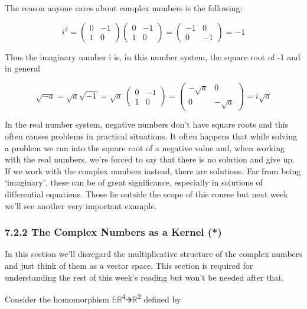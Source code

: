 \documentclass[oneside,english]{amsbook}
\numberwithin{section}{chapter}
\theoremstyle{plain}
\theoremstyle{definition}
\begin{document}
The reason anyone cares about complex numbers is the following:

\[i^{2} = \begin{pmatrix}
	0 & - 1 \\
	1 & 0
\end{pmatrix}\begin{pmatrix}
	0 & - 1 \\
	1 & 0
\end{pmatrix} = \begin{pmatrix}
	- 1 & 0 \\
	0 & - 1
\end{pmatrix} = - 1\]

Thus the imaginary number i is, in this number system, the square root
of -1 and in general

\[\sqrt{- a} = \sqrt{a}\sqrt{- 1} = \sqrt{a}\ \begin{pmatrix}
	0 & - 1 \\
	1 & 0
\end{pmatrix} = \begin{pmatrix}
	- \sqrt{a} & 0 \\
	0 & - \sqrt{a}
\end{pmatrix} = i\sqrt{a}\]

In the real number system, negative numbers don't have square roots and
this often causes problems in practical situations. It often happens
that while solving a problem we run into the square root of a negative
value and, when working with the real numbers, we're forced to say that
there is no solution and give up. If we work with the complex numbers
instead, there are solutions. Far from being `imaginary', these can be
of great significance, especially in solutions of differential
equations. Those lie outside the scope of this course but next week
we'll see another very important example.

\subsubsection{7.2.2 The Complex Numbers as a Kernel
	(*)}\label{the-complex-numbers-as-a-kernel}

In this section we'll disregard the multiplicative structure of the
complex numbers and just think of them as a vector space. This section
is required for understanding the rest of this week's reading but won't
be needed after that.

Consider the homomorphism
f:$\mathbb{R}$\textsuperscript{4}🡪$\mathbb{R}$\textsuperscript{2} defined by
\end{document}
